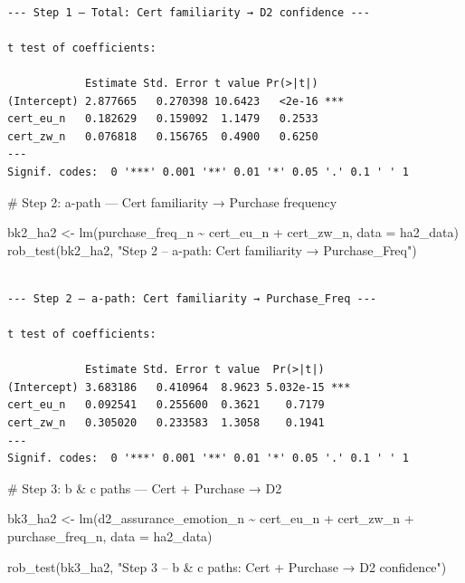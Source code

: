 \documentclass[
  letterpaper,
  DIV=11,
  numbers=noendperiod]{scrartcl}
\newenvironment{Shaded}{\begin{snugshade}}{\end{snugshade}}
\newcommand{\AttributeTok}[1]{\textcolor[rgb]{0.40,0.45,0.13}{#1}}
\newcommand{\CommentTok}[1]{\textcolor[rgb]{0.37,0.37,0.37}{#1}}
\newcommand{\FunctionTok}[1]{\textcolor[rgb]{0.28,0.35,0.67}{#1}}
\newcommand{\NormalTok}[1]{\textcolor[rgb]{0.00,0.23,0.31}{#1}}
\newcommand{\OtherTok}[1]{\textcolor[rgb]{0.00,0.23,0.31}{#1}}
\newcommand{\SpecialCharTok}[1]{\textcolor[rgb]{0.37,0.37,0.37}{#1}}
\newcommand{\StringTok}[1]{\textcolor[rgb]{0.13,0.47,0.30}{#1}}
\begin{document}
\begin{verbatim}

--- Step 1 – Total: Cert familiarity → D2 confidence ---

t test of coefficients:

            Estimate Std. Error t value Pr(>|t|)    
(Intercept) 2.877665   0.270398 10.6423   <2e-16 ***
cert_eu_n   0.182629   0.159092  1.1479   0.2533    
cert_zw_n   0.076818   0.156765  0.4900   0.6250    
---
Signif. codes:  0 '***' 0.001 '**' 0.01 '*' 0.05 '.' 0.1 ' ' 1
\end{verbatim}

\begin{Shaded}
\begin{Highlighting}[]
\CommentTok{\# Step 2: a{-}path — Cert familiarity → Purchase frequency}

\NormalTok{bk2\_ha2 }\OtherTok{\textless{}{-}} \FunctionTok{lm}\NormalTok{(purchase\_freq\_n }\SpecialCharTok{\textasciitilde{}}\NormalTok{ cert\_eu\_n }\SpecialCharTok{+}\NormalTok{ cert\_zw\_n, }\AttributeTok{data =}\NormalTok{ ha2\_data)}
\FunctionTok{rob\_test}\NormalTok{(bk2\_ha2, }\StringTok{"Step 2 – a{-}path: Cert familiarity → Purchase\_Freq"}\NormalTok{)}
\end{Highlighting}
\end{Shaded}

\begin{verbatim}

--- Step 2 – a-path: Cert familiarity → Purchase_Freq ---

t test of coefficients:

            Estimate Std. Error t value  Pr(>|t|)    
(Intercept) 3.683186   0.410964  8.9623 5.032e-15 ***
cert_eu_n   0.092541   0.255600  0.3621    0.7179    
cert_zw_n   0.305020   0.233583  1.3058    0.1941    
---
Signif. codes:  0 '***' 0.001 '**' 0.01 '*' 0.05 '.' 0.1 ' ' 1
\end{verbatim}

\begin{Shaded}
\begin{Highlighting}[]
\CommentTok{\# Step 3: b \& c\textquotesingle{} paths — Cert + Purchase → D2}

\NormalTok{bk3\_ha2 }\OtherTok{\textless{}{-}} \FunctionTok{lm}\NormalTok{(d2\_assurance\_emotion\_n }\SpecialCharTok{\textasciitilde{}}\NormalTok{ cert\_eu\_n }\SpecialCharTok{+}\NormalTok{ cert\_zw\_n }\SpecialCharTok{+}\NormalTok{ purchase\_freq\_n,}
               \AttributeTok{data =}\NormalTok{ ha2\_data)}

\FunctionTok{rob\_test}\NormalTok{(bk3\_ha2, }\StringTok{"Step 3 – b \& c\textquotesingle{} paths: Cert + Purchase → D2 confidence"}\NormalTok{)}
\end{Highlighting}
\end{Shaded}
\end{document}

